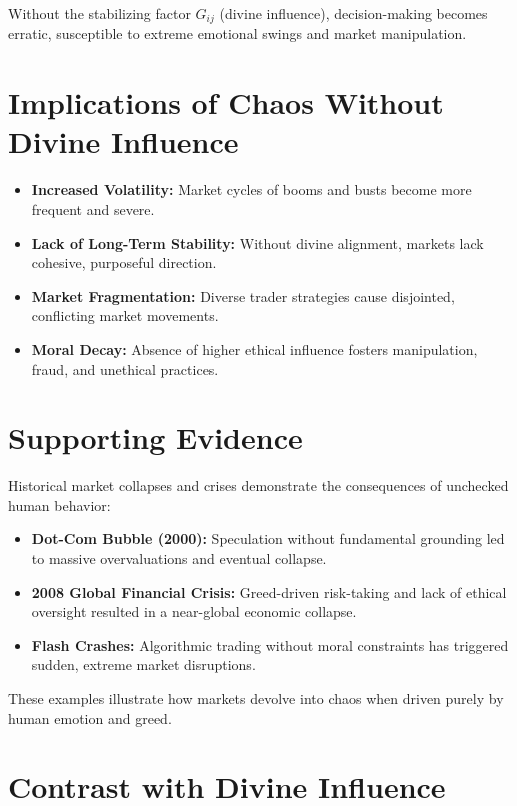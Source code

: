 \documentclass[a4]{article}
\begin{document}
Without the stabilizing factor $G_{ij}$ (divine influence), decision-making becomes erratic, susceptible to extreme emotional swings and market manipulation.



\section{Implications of Chaos Without Divine Influence}

\begin{itemize}
\item  {\bf Increased Volatility:}  Market cycles of booms and busts become more frequent and severe.
\item  {\bf Lack of Long-Term Stability:}  Without divine alignment, markets lack cohesive, purposeful direction.
\item  {\bf Market Fragmentation:}  Diverse trader strategies cause disjointed, conflicting market movements.
\item  {\bf Moral Decay:}  Absence of higher ethical influence fosters manipulation, fraud, and unethical practices.
\end{itemize}


\section{Supporting Evidence}

Historical market collapses and crises demonstrate the consequences of un\-checked human behavior:

\begin{itemize}
\item  {\bf Dot-Com Bubble (2000):}  Speculation without fundamental grounding led to massive overvaluations and eventual collapse.
\item  {\bf 2008 Global Financial Crisis:}  Greed-driven risk-taking and lack of ethical oversight resulted in a near-global economic collapse.
\item  {\bf Flash Crashes:}  Algorithmic trading without moral constraints has triggered sudden, extreme market disruptions.
\end{itemize}


These examples illustrate how markets devolve into chaos when driven purely by human emotion and greed.



\section{Contrast with Divine Influence}
\end{document}
